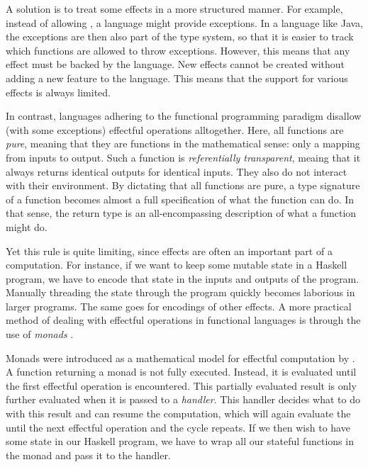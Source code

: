A solution is to treat some effects in a more structured manner. For example, instead of allowing , a language might provide exceptions. In a language like Java, the exceptions are then also part of the type system, so that it is easier to track which functions are allowed to throw exceptions. However, this means that any effect must be backed by the language. New effects cannot be created without adding a new feature to the language. This means that the support for various effects is always limited.

In contrast, languages adhering to the functional programming paradigm disallow (with some exceptions) effectful operations alltogether. Here, all functions are \emph{pure}, meaning that they are functions in the mathematical sense: only a mapping from inputs to output. Such a function is \emph{referentially transparent}, meaing that it always returns identical outputs for identical inputs. They also do not interact with their environment. By dictating that all functions are pure, a type signature of a function becomes almost a full specification of what the function can do. In that sense, the return type is an all-encompassing description of what a function might do.



Yet this rule is quite limiting, since effects are often an important part of a computation. For instance, if we want to keep some mutable state  in a Haskell program, we have to encode that state in the inputs and outputs of the program. Manually threading the state through the program quickly becomes laborious in larger programs. The same goes for encodings of other effects. A more practical method of dealing with effectful operations in functional languages is through the use of \emph{monads} \autocite{wadler_essence_1992,peyton_jones_imperative_1993}.

Monads were introduced as a mathematical model for effectful computation by \textcite{moggi_notions_1991}. A function returning a monad is not fully executed. Instead, it is evaluated until the first effectful operation is encountered. This partially evaluated result is only further evaluated when it is passed to a \emph{handler}. This handler decides what to do with this result and can resume the computation, which will again evaluate the until the next effectful operation and the cycle repeats. If we then wish to have some state in our Haskell program, we have to wrap all our stateful functions in the  monad and pass it to the  handler.

